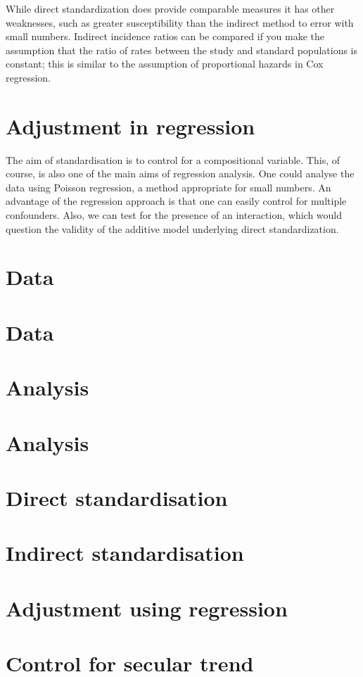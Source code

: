 \documentclass[a4paper]{article}
\begin{document}
While direct standardization does provide comparable measures it has other weaknesses, such as greater susceptibility than the indirect method to error with small numbers. Indirect incidence ratios can be compared if you make the assumption that the ratio of rates between the study and standard populations is constant; this is similar to the assumption of proportional hazards in Cox regression. 
\section{Adjustment in regression}
\label{sec-5}

The aim of standardisation is to control for a compositional variable. This, of course, is also one of the main aims of regression analysis. One could analyse the data using Poisson regression, a method appropriate for small numbers. An advantage of the regression approach is that one can easily control for multiple confounders. Also, we can test for the presence of an interaction, which would question the validity of the additive model underlying direct standardization. 
\section{Data}
\label{sec-6}

\section{Data}
\section{Analysis}
\label{sec-7}

\section{Analysis}
\section{Direct standardisation}
\label{sec-8}
\section{Indirect standardisation}
\label{sec-9}
\section{Adjustment using regression}
\label{sec-10}
\section{Control for secular trend}
\label{sec-11}
\end{document}
